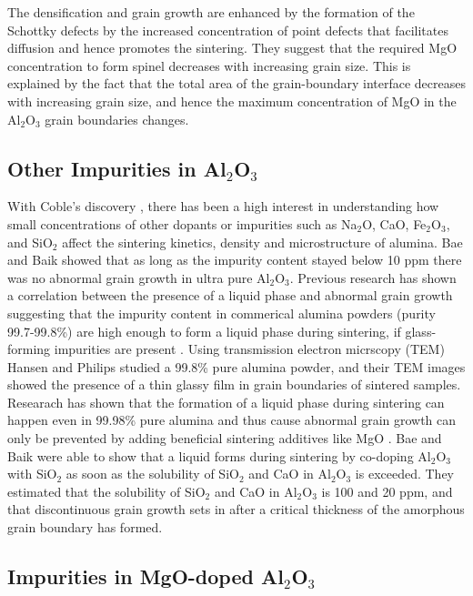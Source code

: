 \noindent The densification and grain growth are enhanced by the formation of the Schottky defects by the increased concentration of point defects that facilitates diffusion and hence promotes the sintering.  They suggest that the required MgO concentration to form spinel decreases with increasing grain size. This is explained by the fact that the total area of the grain-boundary interface decreases with increasing grain size, and hence the maximum concentration of MgO in the Al$_{2}$O$_{3}$ grain boundaries changes.

\subsection{Other Impurities in Al$_{2}$O$_{3}$}

With Coble's discovery \cite{Coble1961,Coble1962,Coble1962a}, there has been a high interest in understanding how small concentrations of other dopants or impurities such as Na$_{2}$O, CaO, Fe$_{2}$O$_{3}$, and SiO$_{2}$ affect the sintering kinetics, density and microstructure of alumina. Bae and Baik \cite{Bae1993a,Bae1997} showed that as long as the impurity content stayed below 10 ppm there was no abnormal grain growth in ultra pure Al$_{2}$O$_{3}$. Previous research has shown a correlation between the presence of a liquid phase and abnormal grain growth suggesting that the impurity content in commerical alumina powders (purity 99.7-99.8\%) are high enough to form a liquid phase during sintering, if glass-forming impurities are present \cite{Compson2013,Bae1993,Handwerker1989,Gavrilov1999,KAYSSER1987,Ahn2003}. Using transmission electron micrscopy (TEM) Hansen and Philips \cite{Hansen1983} studied a 99.8\% pure alumina powder, and their TEM images showed the presence of a thin glassy film in grain boundaries of sintered samples. Researach has shown that the formation of a liquid phase during sintering can happen even in 99.98\% pure alumina and thus cause abnormal grain growth can only be prevented by adding beneficial sintering additives like MgO \cite{Harmer1984}. Bae and Baik \cite{Bae1993a} were able to show that a liquid forms during sintering by co-doping Al$_{2}$O$_{3}$ with SiO$_{2}$ as soon as the solubility of SiO$_{2}$ and CaO in Al$_{2}$O$_{3}$ is exceeded. They estimated that the solubility of SiO$_{2}$ and CaO in Al$_{2}$O$_{3}$ is 100 and 20 ppm, and that discontinuous grain growth sets in after a critical thickness of the amorphous grain boundary has formed.

\subsection{Impurities in MgO-doped Al$_{2}$O$_{3}$}

